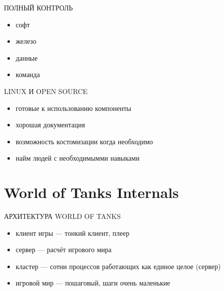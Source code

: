 \documentclass[aspectratio=169]{beamer}
\begin{document}
\begin{frame}{ПОЛНЫЙ КОНТРОЛЬ}
    \begin{itemize}
        \item софт
        \item железо
        \item данные
        \item команда
    \end{itemize}
\end{frame}

\begin{frame}{LINUX И OPEN SOURCE}
    \begin{itemize}
        \item готовые к использованию компоненты
        \item хорошая документация
        \item возможность костомизации когда необходимо
        \item найм людей с необходимымми навыками
    \end{itemize}
\end{frame}

\section{World of Tanks Internals}
{
\begin{frame}[plain]{}
\end{frame}
}

\begin{frame}{АРХИТЕКТУРА WORLD OF TANKS}
    \begin{itemize}
        \item клиент игры --- тонкий клиент, плеер
        \item сервер --- расчёт игрового мира
        \item кластер --- сотни процессов работающих как единое целое (сервер)
        \item игровой мир --- пошаговый, шаги очень маленькие
    \end{itemize}
\end{frame}
\end{document}
